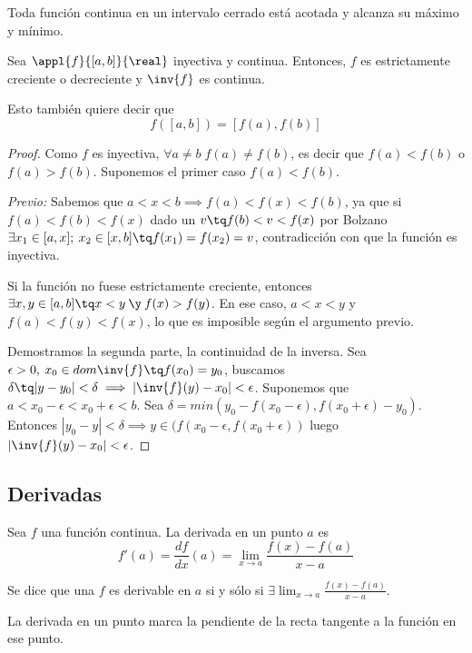 \documentclass[nochap]{apuntes}
\begin{document}
\begin{theorem}
\label{thmWeierstrass}
Toda función continua en un intervalo cerrado está acotada y alcanza su máximo y mínimo.
\end{theorem}

\begin{theorem}
Sea $\appl{f}{[a,b]}{\real}$ inyectiva y continua. Entonces, $f$ es estrictamente creciente o decreciente y $\inv{f}$ es continua.
\end{theorem}

\begin{remark}
Esto también quiere decir que\[f([a,b])=[f(a),f(b)]\]
\end{remark}

\begin{proof}
Como $f$ es inyectiva, $\forall a\neq b \; f(a)\neq f(b)$, es decir que $f(a)<f(b)$ o $f(a)>f(b)$. Suponemos el primer caso $f(a)<f(b)$.

\textit{Previo:} Sabemos que $a<x<b \implies f(a)<f(x)<f(b)$, ya que si $f(a)<f(b)<f(x)$ dado un $v\tq f(b)<v<f(x)$ por Bolzano $\exists x_1\in [a,x];\: x_2\in [x,b] \tq f(x_1)=f(x_2)=v$, contradicción con que la función es inyectiva.

Si la función no fuese estrictamente creciente, entonces $\exists x,y \in [a,b] \tq x<y \:\y\: f(x)>f(y)$. En ese caso, $a<x<y$ y $f(a)<f(y)<f(x)$, lo que es imposible según el argumento previo.

Demostramos la segunda parte, la continuidad de la inversa. Sea $\epsilon >0, \:x_0\in dom \inv{f} \tq f(x_0)=y_0$, buscamos $\delta \tq |y-y_0|<\delta \implies |\inv{f}(y)-x_0|<\epsilon$. Suponemos que $a<x_0-\epsilon < x_0+\epsilon < b$. Sea $\delta=min(y_0-f(x_0-\epsilon), f(x_0+\epsilon)-y_0)$. Entonces $|y_0-y|<\delta \implies y\in (f(x_0-\epsilon, f(x_0+\epsilon))$ luego $|\inv{f}(y)-x_0|<\epsilon$.
\end{proof}

\subsection{Derivadas}

\begin{defn}[Derivada]
Sea $f$ una función continua. La derivada en un punto $a$ es
\[f'(a)=\frac{df}{dx}(a)=\lim_{x\to a} \frac{f(x)-f(a)}{x-a} \]

Se dice que una $f$ es derivable en $a$ si y sólo si $\exists \lim_{x\to a} \frac{f(x)-f(a)}{x-a}$.

La derivada en un punto marca la pendiente de la recta tangente a la función en ese punto.
\end{defn}
\end{document}

